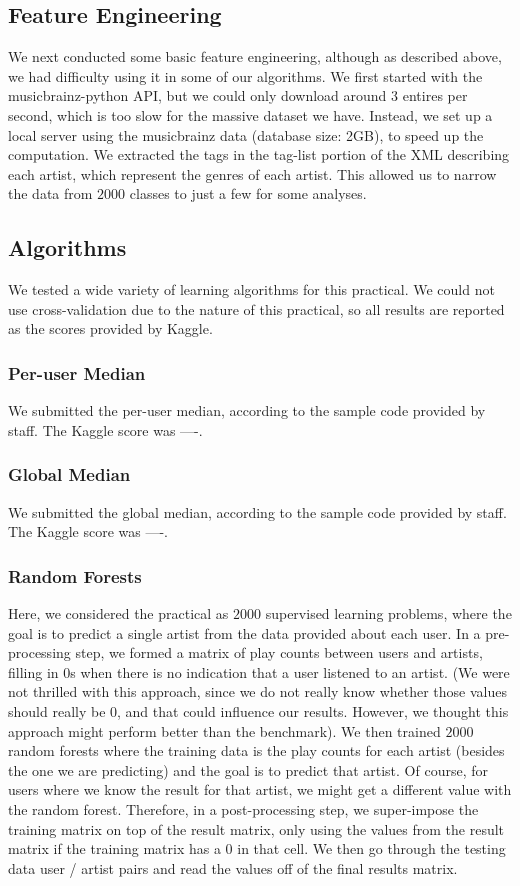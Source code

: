 \documentclass[10pt]{article}
\begin{document}
\subsection{Feature Engineering}
We next conducted some basic feature engineering, although as described above, we had difficulty using it in some of our algorithms. We first started with the musicbrainz-python API, but we could only download around $3$ entires per second, which is too slow for the massive dataset we have. Instead, we set up a local server using the musicbrainz data (database size: 2GB), to speed up the computation. We extracted the tags in the tag-list portion of the XML describing each artist, which represent the genres of each artist. This allowed us to narrow the data from $2000$ classes to just a few for some analyses.

\subsection{Algorithms}
We tested a wide variety of learning algorithms for this practical. We could not use cross-validation due to the nature of this practical, so all results are reported as the scores provided by Kaggle.
\subsubsection{Per-user Median}
We submitted the per-user median, according to the sample code provided by staff. The Kaggle score was ----.

\subsubsection{Global Median}
We submitted the global median, according to the sample code provided by staff. The Kaggle score was ----.

\subsubsection{Random Forests}
Here, we considered the practical as $2000$ supervised learning problems, where the goal is to predict a single artist from the data provided about each user. In a pre-processing step, we formed a matrix of  play counts between users and artists, filling in $0$s when there is no indication that a user listened to an artist. (We were not thrilled with this approach, since we do not really know whether those values should really be $0$, and that could influence our results. However, we thought this approach might perform better than the benchmark). We then trained $2000$ random forests where the training data is the play counts for each artist (besides the one we are predicting) and the goal is to predict that artist. Of course, for users where we know the result for that artist, we might get a different value with the random forest. Therefore, in a post-processing step, we super-impose the training matrix on top of the result matrix, only using the values from the result matrix if the training matrix has a $0$ in that cell. We then go through the testing data user / artist pairs and read the values off of the final results matrix.
\end{document}
